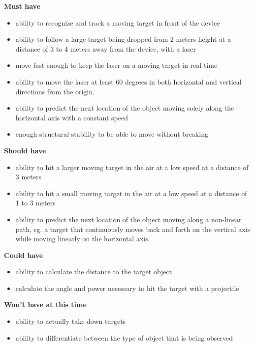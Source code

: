 \textbf{Must have}
\begin{itemize}
	\item ability to recognize and track a moving target in front of the device
	\item ability to follow a large target being dropped from 2 meters height at a distance of 3 to 4 meters away from the device, with a laser
	\item move fast enough to keep the laser on a moving target in real time
	\item ability to move the laser at least 60 degrees in both horizontal and vertical directions from the origin.
	\item ability to predict the next location of the object moving solely along the horizontal axis with a constant speed
	\item enough structural stability to be able to move without breaking
\end{itemize}

\textbf{Should have}
\begin{itemize}
	\item ability to hit a larger moving target in the air at a low speed at a distance of 3 meters
	\item ability to hit a small moving target in the air at a low speed at a distance of 1 to 3 meters
	\item ability to predict the next location of the object moving along a non-linear path, eg{.} a target that continuously moves back and forth on the vertical axis while moving linearly on the horizontal axis.
\end{itemize}

\textbf{Could have}
\begin{itemize}
	\item ability to calculate the distance to the target object
	\item calculate the angle and power necessary to hit the target with a projectile
\end{itemize}

\textbf{Won't have at this time}
\begin{itemize}
	\item ability to actually take down targets
	\item ability to differentiate between the type of object that is being observed
\end{itemize}

